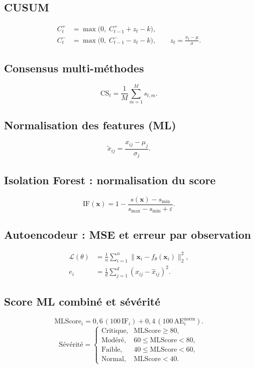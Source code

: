 \subsection{CUSUM}
\begin{align}
C^{+}_t &= \max\bigl(0,\; C^{+}_{t-1}+z_t-k\bigr),\\
C^{-}_t &= \max\bigl(0,\; C^{-}_{t-1}-z_t-k\bigr),
\qquad z_t=\frac{x_t-\mu}{\sigma}.
\end{align}

\subsection{Consensus multi-méthodes}
\begin{equation}
\mathrm{CS}_t=\frac{1}{M}\sum_{m=1}^{M}s_{t,m}.
\end{equation}

\subsection{Normalisation des features (ML)}
\begin{equation}
\tilde{x}_{ij}=\frac{x_{ij}-\mu_j}{\sigma_j}.
\end{equation}

\subsection{Isolation Forest : normalisation du score}
\begin{equation}
\mathrm{IF}(\mathbf{x})=1-\frac{s(\mathbf{x})-s_{\min}}{s_{\max}-s_{\min}+\varepsilon}.
\end{equation}

\subsection{Autoencodeur : MSE et erreur par observation}
\begin{align}
\mathcal{L}(\theta) &= \frac{1}{n}\sum_{i=1}^{n}\|\mathbf{x}_i-f_\theta(\mathbf{x}_i)\|_2^2,\\
e_i &= \frac{1}{d}\sum_{j=1}^{d}(x_{ij}-\hat{x}_{ij})^2.
\end{align}

\subsection{Score ML combiné et sévérité}
\begin{equation}
\mathrm{MLScore}_i
=
0{,}6\,(100\,\mathrm{IF}_i)+0{,}4\,(100\,\mathrm{AE}^{\mathrm{norm}}_i).
\end{equation}
\begin{equation}
\text{Sévérité}=
\begin{cases}
\text{Critique}, & \mathrm{MLScore}\ge 80,\\
\text{Modéré},   & 60\le \mathrm{MLScore}<80,\\
\text{Faible},   & 40\le \mathrm{MLScore}<60,\\
\text{Normal},   & \mathrm{MLScore}<40.
\end{cases}
\end{equation}
